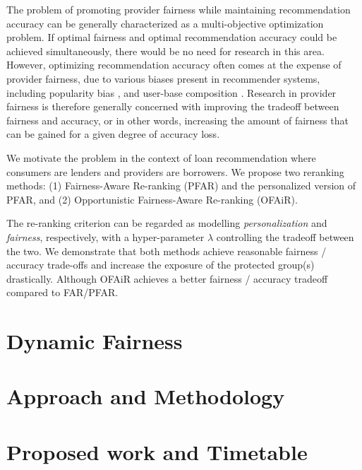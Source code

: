 \documentclass[manuscript,screen,review]{acmart}
\begin{document}
The problem of promoting provider fairness while maintaining recommendation accuracy can be generally characterized as a multi-objective optimization problem. If optimal fairness and optimal recommendation accuracy could be achieved simultaneously, there would be no need for research in this area. However, optimizing recommendation accuracy often comes at the expense of provider fairness, due to various biases present in recommender systems, including popularity bias \cite{celma2008hits,lee2014fairness}, and user-base composition \cite{lin2019crank, yao2017beyond}. Research in provider fairness is therefore generally concerned with improving the tradeoff between fairness and accuracy, or in other words, increasing the amount of fairness that can be gained for a given degree of accuracy loss.

We motivate the problem in the context of loan recommendation where consumers are lenders and providers are borrowers. We propose two reranking methods: (1) Fairness-Aware Re-ranking (PFAR) and the personalized version of PFAR, and (2) Opportunistic Fairness-Aware Re-ranking (OFAiR).

The re-ranking criterion can be regarded as modelling \textit{personalization} and \textit{fairness}, respectively, with a hyper-parameter $\lambda$ controlling the tradeoff between the two. We demonstrate that both methods achieve reasonable fairness / accuracy trade-offs and increase the exposure of the protected group(s) drastically. Although OFAiR achieves a better fairness / accuracy tradeoff compared to FAR/PFAR.




\section{Dynamic Fairness}


\section{Approach and Methodology}


\section{Proposed work and Timetable}




\end{document}
